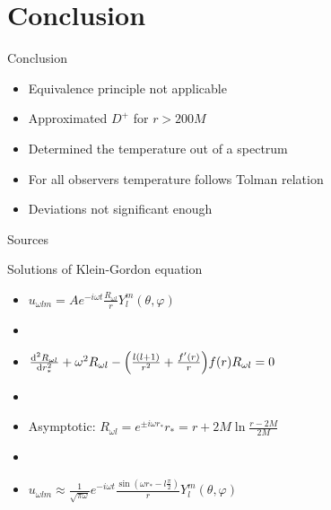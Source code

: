 \documentclass{beamer}
\begin{document}
\section{Conclusion}
\begin{frame}{Conclusion}
\begin{itemize}
	\item Equivalence principle not applicable
	\item Approximated \(D^+\) for \(r > 200M\)
	\item Determined the temperature out of a spectrum
	\item For all observers temperature follows Tolman relation
	\item Deviations not significant enough
\end{itemize}
\end{frame}

\begin{frame}{Sources}
\printbibliography
\end{frame}

\begin{frame}
\maketitle
\end{frame}

\begin{frame}{Solutions of Klein-Gordon equation \cite{davies}}
\begin{itemize}
	\item \(u_{\omega l m} = A e^{-i\omega t} \frac{R_{\omega l}}{r}Y_l^m (\theta, \varphi)\)
	\item[]
	\item \(\dv[2]{R_{\omega l}}{r_*} + \omega^2 R_{\omega l} -\qty(\frac{l(l+1)}{r^2} + \frac{f'(r)}{r})f(r) R_{\omega l} = 0\)
	\item[]
	\item Asymptotic: \(R_{\omega l} = e^{\pm i\omega r_*}\)\hspace{3cm}\(r_* = r + 2M \ln \frac{r-2M}{2M}\)
	\item[]	
	\item \(u_{\omega l m} \approx \frac{1}{\sqrt{\pi\omega}} e^{-i\omega t} \frac{\sin(\omega r_* - l\frac{\pi}{2})}{r} Y_l^m (\theta, \varphi)\) 
\end{itemize}
\end{frame}
\end{document}
